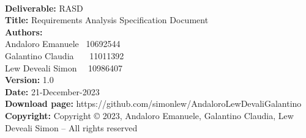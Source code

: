 \documentclass{Configuration_Files/PoliMi3i_project}
\begin{document}


\pagestyle{empty} %
\frontmatter %


\newpage
    \textbf{}\\
    \textbf{Deliverable:} RASD\\
    \textbf{Title:} Requirements Analysis Specification Document \\
    \textbf{Authors:} \\ Andaloro Emanuele \ 10692544 \\ 
      Galantino Claudia \ \ \ 11011392 \\
      Lew Deveali Simon \ \ 10986407 \\
    \textbf{Version:} 1.0 \\ 
    \textbf{Date:}  21-December-2023 \\
    \textbf{Download page:} https://github.com/simonlew/AndaloroLewDevaliGalantino \\
    \textbf{Copyright:} Copyright © 2023, Andaloro Emanuele, Galantino Claudia, Lew Deveali Simon – All rights reserved \\

\end{document}

